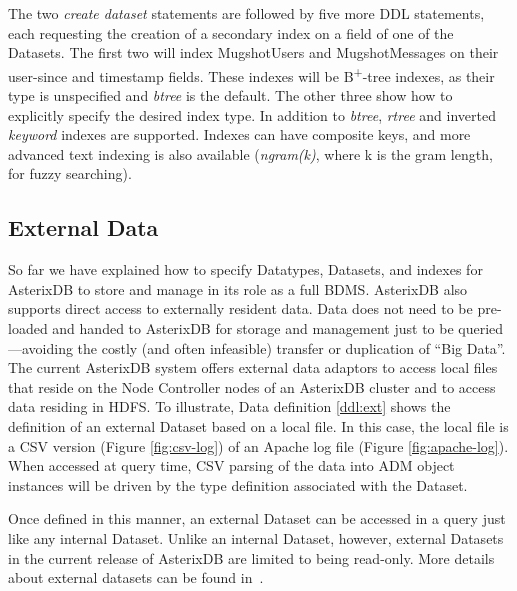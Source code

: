 
The two \emph{create dataset} statements are followed by five more DDL statements, each requesting the creation of a secondary index on a field of one of the Datasets. 
The first two will index MugshotUsers and MugshotMessages on their user-since and timestamp fields. 
These indexes will be B\textsuperscript{+}-tree indexes, as their type is unspecified and \emph{btree} is the default. 
The other three show how to explicitly specify the desired index type. 
In addition to \emph{btree}, \emph{rtree} and inverted \emph{keyword} indexes are supported. 
Indexes can have composite keys, and more advanced text indexing is also available (\emph{ngram(k)}, where k is the gram length, for fuzzy searching).

\subsection{External Data}

So far we have explained how to specify Datatypes, Datasets, and indexes for AsterixDB to store and manage in its role as a full BDMS.  
AsterixDB also supports direct access to externally resident data.
Data does not need to be pre-loaded and handed to AsterixDB for storage and management just to be queried---avoiding the costly (and often infeasible) transfer or duplication of ``Big Data''.
The current AsterixDB system offers external data adaptors to access local files that reside on the Node Controller nodes of an AsterixDB cluster and to access data residing in HDFS. 
To illustrate, Data definition \ref{ddl:ext} shows the definition of an external Dataset based on a local file.  
In this case, the local file is a CSV version (Figure \ref{fig:csv-log}) of an Apache log file (Figure \ref{fig:apache-log}). 
When accessed at query time, CSV parsing of the data into ADM object instances will be driven by the type definition associated with the Dataset.

Once defined in this manner, an external Dataset can be accessed in a query just like any internal Dataset.
Unlike an internal Dataset, however, external Datasets in the current release of AsterixDB are limited to being read-only. More details about external datasets can be found in~\cite{DBLP:conf/cikm/AlamoudiGCB15}.

